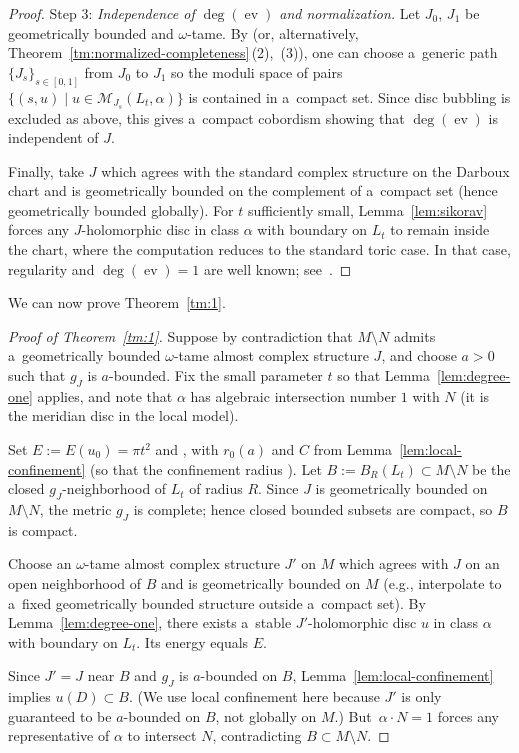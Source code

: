 \documentclass[pdftex]{sigma}
\numberwithin{equation}{section}
\newcommand{\ev}{\operatorname{ev}}
\theoremstyle{definition}
\begin{document}
\begin{proof}
Step 3: \emph{Independence of $\deg(\ev)$ and normalization.}
Let $J_0$, $J_1$ be geometrically bounded and $\omega$-tame.
By \cite[Theorem 4.15\,(a)]{GromanFloerOpen} (or, alternatively, Theorem~\ref{tm:normalized-completeness}\,(2),~(3)), one can choose a~generic path $\{J_s\}_{s\in[0,1]}$ from $J_0$ to $J_1$ so the moduli space of pairs $\{(s,u)\mid u\in \mathcal{M}_{J_s}(L_t,\alpha)\}$ is contained in a~compact set. Since disc bubbling is excluded as above, this gives a~compact cobordism showing that $\deg(\ev)$ is independent of $J$.

Finally, take $J$ which agrees with the standard complex structure on the Darboux chart and is geometrically bounded on the complement of a~compact set (hence geometrically bounded globally). For $t$ sufficiently small, Lemma~\ref{lem:sikorav} forces any $J$-holomorphic disc in class $\alpha$ with boundary on $L_t$ to remain inside the chart, where the computation reduces to the standard toric case. In that case, regularity and $\deg(\ev)=1$ are well known; see~\cite{ChoOhToric,FOOO_Toric1}.
\end{proof}

We can now prove Theorem~\ref{tm:1}.
\begin{proof}[Proof of Theorem~\ref{tm:1}]
Suppose by contradiction that $M\setminus N$ admits a~geometrically bounded $\omega$-tame almost complex structure $J$, and choose $a>0$ such that $g_J$ is $a$-bounded.
Fix the small parameter $t$ so that Lemma~\ref{lem:degree-one} applies, and note that $\alpha$ has algebraic intersection number $1$ with $N$ (it is the meridian disc in the local model).

Set $E:=E(u_0)=\pi t^2$ and , with $r_0(a)$ and $C$ from Lemma~\ref{lem:local-confinement} (so that the confinement radius ).
Let $B:=B_{R}(L_t)\subset M\setminus N$ be the closed $g_J$-neighborhood of $L_t$ of radius $R$.
Since $J$ is geometrically bounded on $M\setminus N$, the metric $g_J$ is complete; hence closed bounded subsets are compact, so $B$ is compact.

Choose an $\omega$-tame almost complex structure $J'$ on $M$ which agrees with $J$ on an open neighborhood of $B$ and is geometrically bounded on $M$ (e.g., interpolate to a~fixed geometrically bounded structure outside a~compact set).
By Lemma~\ref{lem:degree-one}, there exists a~stable $J'$-holomorphic disc $u$ in class $\alpha$ with boundary on $L_t$.
Its energy equals $E$.

Since $J'=J$ near $B$ and $g_J$ is $a$-bounded on $B$, Lemma~\ref{lem:local-confinement} implies $u(D)\subset B$. (We use local confinement here because $J'$ is only guaranteed to be $a$-bounded on $B$, not globally on $M$.)
But~${\alpha\cdot N=1}$ forces any representative of $\alpha$ to intersect $N$, contradicting $B\subset M\setminus N$.
\end{proof}
\end{document}

